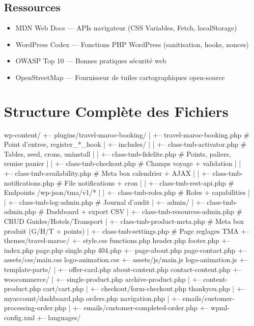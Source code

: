\documentclass[12pt,a4paper]{report}
\begin{document}
\section*{Ressources}
\begin{itemize}
  \item MDN Web Docs --- APIs navigateur (CSS Variables, Fetch, localStorage)
  \item WordPress Codex --- Fonctions PHP WordPress (sanitisation, hooks, nonces)
  \item OWASP Top 10 --- Bonnes pratiques s\'ecurit\'e web
  \item OpenStreetMap --- Fournisseur de tuiles cartographiques open-source
\end{itemize}

\appendix

\chapter{Structure Compl\`ete des Fichiers}

\begin{shellbox}
wp-content/
+-- plugins/travel-maroc-booking/
|   +-- travel-maroc-booking.php   # Point d'entree, register_*_hook
|   +-- includes/
|   |   +-- class-tmb-activator.php     # Tables, seed, crons, uninstall
|   |   +-- class-tmb-fidelite.php     # Points, paliers, remise panier
|   |   +-- class-tmb-checkout.php     # Champs voyage + validation
|   |   +-- class-tmb-availability.php # Meta box calendrier + AJAX
|   |   +-- class-tmb-notifications.php # File notifications + cron
|   |   +-- class-tmb-rest-api.php     # Endpoints /wp-json/tma/v1/*
|   |   +-- class-tmb-roles.php        # Roles + capabilities
|   |   +-- class-tmb-log-admin.php    # Journal d'audit
|   +-- admin/
|       +-- class-tmb-admin.php        # Dashboard + export CSV
|       +-- class-tmb-resources-admin.php # CRUD Guides/Hotels/Transport
|       +-- class-tmb-product-meta.php # Meta box produit (G/H/T + points)
|       +-- class-tmb-settings.php     # Page reglages TMA
+-- themes/travel-maroc/
    +-- style.css  functions.php  header.php  footer.php
    +-- index.php  page.php  single.php  404.php
    +-- page-about.php  page-contact.php
    +-- assets/css/main.css  logo-animation.css
    +-- assets/js/main.js  logo-animation.js
    +-- template-parts/
    |   +-- offer-card.php  about-content.php  contact-content.php
    +-- woocommerce/
    |   +-- single-product.php  archive-product.php
    |   +-- content-product.php  cart/cart.php
    |   +-- checkout/form-checkout.php  thankyou.php
    |   +-- myaccount/dashboard.php  orders.php  navigation.php
    |   +-- emails/customer-processing-order.php
    |   +-- emails/customer-completed-order.php
    +-- wpml-config.xml
    +-- languages/
\end{shellbox}
\end{document}

